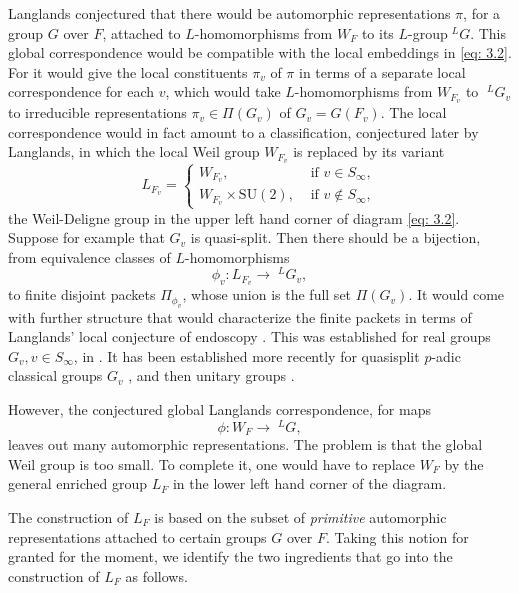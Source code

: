 \documentclass[preprint,12pt, leqno]{elsarticle}
\newcommand{\ubf}[1]{\textit{#1}}
\newcommand{\LG}{\;^LG}
\numberwithin{equation}{section}
\theoremstyle{named}
\begin{document}
Langlands conjectured that there would be automorphic representations $\pi$, for a group $G$ over $F$, attached to $L$-homomorphisms from $W_F$ to its $L$-group$\LG$. This global correspondence would be compatible with the local embeddings in \eqref{eq: 3.2}. For it would give the local constituents $\pi_v$ of $\pi$ in terms of a separate local correspondence for each $v$, which would take $L$-homomorphisms from $W_{F_v}$ to $\LG_v$ to irreducible representations $\pi_v\in\Pi(G_v)$ of $G_v = G(F_v)$. The local correspondence would in fact amount to a classification, conjectured later by Langlands, in which the local Weil group $W_{F_v}$ is replaced by its variant
\begin{equation*}
    L_{F_v} = 
    \begin{cases} 
          W_{F_v}, & \mbox{ if } v\in S_{\infty}, \\
          W_{F_v} \times \mbox{SU}(2), & \mbox{ if } v\notin S_{\infty},
       \end{cases}
\end{equation*}
the Weil-Deligne group in the upper left hand corner of diagram \eqref{eq: 3.2}. Suppose for example that $G_v$ is quasi-split. Then there should be a bijection, from equivalence classes of $L$-homomorphisms
\begin{equation}\label{eq: 3.3}
    \phi_v: L_{F_v} \longrightarrow \LG_v,
\end{equation}
to finite disjoint packets $\Pi_{\phi_v}$, whose union is the full set $\Pi(G_v)$. It would come with further structure that would characterize the finite packets in terms of Langlands' local conjecture of endoscopy \cite{N12}. This  was established for real groups $G_v, v\in S_{\infty}$, in \cite{N13}. It has been established more recently for quasisplit $p$-adic classical groups $G_v$ \cite{Ar3}, and then unitary groups \cite{Mo}.

However, the conjectured global Langlands correspondence, for maps
\begin{equation*}
    \phi: W_F\longrightarrow\LG,
\end{equation*}
leaves out many automorphic representations. The problem is that the global Weil group is too small. To complete it, one would have to replace $W_F$ by the general enriched group $L_F$ in the lower left hand corner of the diagram.

The construction of $L_F$ is based on the subset of \ubf{primitive} automorphic representations attached to certain groups $G$ over $F$. Taking this notion for granted for the moment, we identify the two ingredients that go into the construction of $L_F$ as follows.
\end{document}
